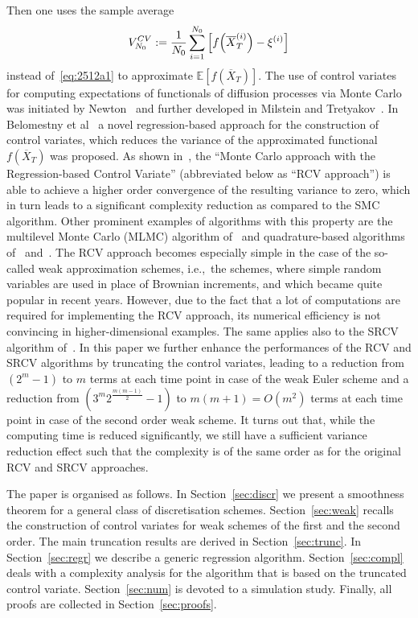 \documentclass[11pt,a4paper]{amsart}
\theoremstyle{plain}
\theoremstyle{definition}
\theoremstyle{remark}
\numberwithin{equation}{section}
\newcommand*{\EE}{\mathbb E}
\renewcommand*{\doteq}{:=}
\begin{document}
Then one uses the sample average
\begin{align}\label{eq:2512a2}
V_{N_0}^{CV}\doteq\frac{1}{N_0}\sum_{i=1}^{N_0}
\left[f\Bigl(\overline{X}_T^{(i)}\Bigr)-\xi^{(i)}\right]
\end{align}
instead of~\eqref{eq:2512a1} to approximate $\EE [f(\overline{X}_{T})]$.
The use of control variates for computing expectations of functionals of diffusion processes via Monte Carlo  was initiated by Newton~\cite{newton1994variance} and further developed in Milstein and Tretyakov~\cite{milstein2009practical}.
In Belomestny et al~\cite{belomestny2016variance} a novel regression-based approach for the construction of control variates, which reduces the variance of  the approximated functional \(f(\overline{X}_{T})\) was proposed. 
As shown in~\cite{belomestny2016variance},
the ``Monte Carlo approach with
the Regression-based Control Variate''
(abbreviated below as ``RCV approach'') is able to achieve a higher order convergence
of  the resulting variance to zero,
which in turn leads to a significant complexity reduction
as compared to the SMC algorithm. Other prominent examples of algorithms with this property are the multilevel Monte Carlo (MLMC) algorithm of~\cite{giles2008multilevel} and quadrature-based algorithms of~\cite{muller2015complexity} and~\cite{muller1324deterministic}.
The RCV approach becomes especially simple
in the case of the so-called weak approximation schemes,
i.e.,\ the schemes, where simple random variables
are used in place of Brownian increments,
and which became quite popular in recent years. However, due to the fact that a lot of computations are required for implementing the RCV approach, its numerical efficiency is not convincing in higher-dimensional examples.
The same applies also to the SRCV algorithm of~\cite{belomestny2016stratified}.
In this paper we further enhance the performances
of the RCV and SRCV algorithms by truncating the control variates, leading to a reduction from $(2^m-1)$ to $m$ terms at each time point in case of the weak Euler scheme and a reduction from $(3^m2^\frac{m(m-1)}{2}-1)$ to $m(m+1)=O(m^2)$ terms at each time point in case of the second order weak scheme. It turns out that, while the computing time is reduced significantly, we still have a sufficient variance reduction effect such that the complexity is of the same order as for the original RCV and SRCV approaches. 

The paper is organised as follows.
In Section~\ref{sec:discr} we present a smoothness theorem for a general class of discretisation schemes.
Section~\ref{sec:weak} recalls the construction of control variates for weak schemes of the first and the second order.
The main truncation results are derived in Section~\ref{sec:trunc}.
In Section~\ref{sec:regr} we describe a generic regression algorithm. Section~\ref{sec:compl} deals with a complexity analysis for the algorithm that is based on the truncated control variate.
Section~\ref{sec:num} is devoted to a simulation study.
Finally, all proofs are collected in Section~\ref{sec:proofs}.
\end{document}
